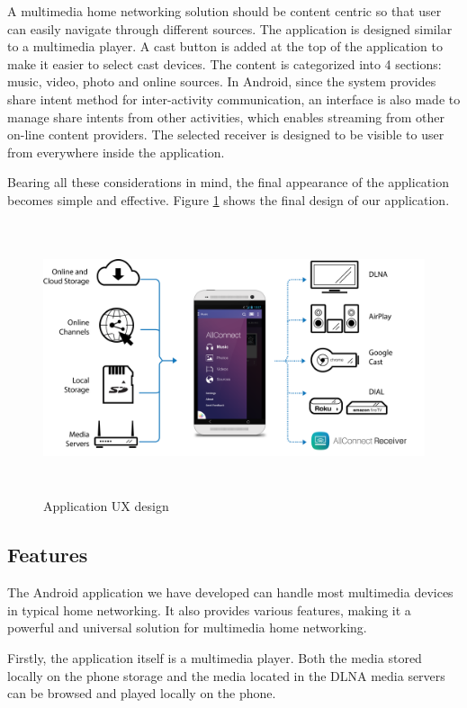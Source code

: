 A multimedia home networking solution should be content centric so that user can easily navigate through different sources. The application is designed similar to a multimedia player. A cast button is added at the top of the application to make it easier to select cast devices. The content is categorized into 4 sections: music, video, photo and online sources. In Android, since the system provides share intent method for inter-activity communication, an interface is also made to manage share intents from other activities, which enables streaming from other on-line content providers. The selected receiver is designed to be visible to user from everywhere inside the application. 

Bearing all these considerations in mind, the final appearance of the application becomes simple and effective. Figure \ref{chart5} shows the final design of our application.

\begin{figure}[htb]
\centering \includegraphics[height=8cm]{charts/allconnect-app}
\caption{Application UX design \label{chart5}}
\end{figure}

\subsection{Features\label{3_4}}
The Android application we have developed can handle most multimedia devices in typical home networking. It also provides various features, making it a powerful and universal solution for multimedia home networking.

Firstly, the application itself is a multimedia player. Both the media stored locally on the phone storage and the media located in the DLNA media servers can be browsed and played locally on the phone.

